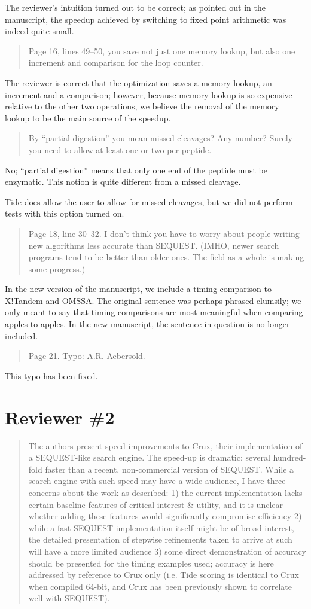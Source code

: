 \documentclass{article}
\newcommand{\breview}{\begin{quotation}\begin{em}\noindent}
\newcommand{\ereview}{\end{em}\end{quotation}}
\begin{document}
The reviewer's intuition turned out to be correct; as pointed out in
the manuscript, the speedup achieved by switching to fixed point
arithmetic was indeed quite small.

\breview Page 16, lines 49–50, you save not just one memory lookup,
but also one increment and comparison for the loop counter. \ereview

The reviewer is correct that the optimization saves a memory lookup,
an increment and a comparison; however, because memory lookup is so
expensive relative to the other two operations, we believe the removal
of the memory lookup to be the main source of the speedup.

\breview By ``partial digestion'' you mean missed cleavages? Any
number? Surely you need to allow at least one or two per peptide.
\ereview

No; ``partial digestion'' means that only one end of the peptide must
be enzymatic.  This notion is quite different from a missed cleavage.

Tide does allow the user to allow for missed cleavages, but we did not
perform tests with this option turned on.

\breview Page 18, line 30–32. I don't think you have to worry about
people writing new algorithms less accurate than SEQUEST. (IMHO, newer
search programs tend to be better than older ones.  The field as a
whole is making some progress.) \ereview

In the new version of the manuscript, we include a timing comparison
to X!Tandem and OMSSA. The original sentence was perhaps phrased
clumsily; we only meant to say that timing comparisons are most
meaningful when comparing apples to apples. In the new manuscript, the
sentence in question is no longer included.

\breview Page 21. Typo: A.R. Aebersold. \ereview

This typo has been fixed.

\clearpage
\section*{Reviewer \#2}

\breview The authors present speed improvements to Crux, their
implementation of a SEQUEST-like search engine. The speed-up is
dramatic: several hundred-fold faster than a recent, non-commercial
version of SEQUEST. While a search engine with such speed may have a
wide audience, I have three concerns about the work as described: 1)
the current implementation lacks certain baseline features of critical
interest \& utility, and it is unclear whether adding these features
would significantly compromise efficiency 2) while a fast SEQUEST
implementation itself might be of broad interest, the detailed
presentation of stepwise refinements taken to arrive at such will have
a more limited audience 3) some direct demonstration of accuracy
should be presented for the timing examples used; accuracy is here
addressed by reference to Crux only (i.e. Tide scoring is identical to
Crux when compiled 64-bit, and Crux has been previously shown to
correlate well with SEQUEST). \ereview
\end{document}
